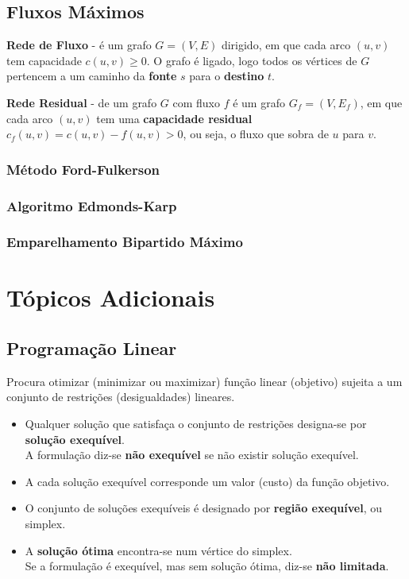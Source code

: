 \documentclass[11pt]{article}
\begin{document}
\subsection{Fluxos Máximos} 

\textbf{Rede de Fluxo} - é um grafo $G=(V,E)$ dirigido, em que cada arco $(u,v)$ tem capacidade $c(u,v) \ge 0$. O grafo é ligado, logo todos os vértices de $G$ pertencem a um caminho da \textbf{fonte} $s$ para o \textbf{destino} $t$.

\textbf{Rede Residual} - de um grafo $G$ com fluxo $f$ é um grafo $G_f=(V,E_f)$, em que cada arco $(u,v)$ tem uma \textbf{capacidade residual} $c_f(u,v)=c(u,v)-f(u,v)>0$, ou seja, o fluxo que sobra de $u$ para $v$.

\subsubsection{Método Ford-Fulkerson}



\subsubsection{Algoritmo Edmonds-Karp}



\subsubsection{Emparelhamento Bipartido Máximo}



\newpage

\section{Tópicos Adicionais}

\subsection{Programação Linear} 

Procura otimizar (minimizar ou maximizar) função linear (objetivo) sujeita a um conjunto de restrições (desigualdades) lineares.

\begin{itemize}[topsep=0pt]
    \item Qualquer solução que satisfaça o conjunto de restrições designa-se por \textbf{solução exequível}. \\[4pt]
          A formulação diz-se \textbf{não exequível} se não existir solução exequível.
    \item A cada solução exequível corresponde um valor (custo) da função objetivo.
    \item O conjunto de soluções exequíveis é designado por \textbf{região exequível}, ou simplex.
    \item A \textbf{solução ótima} encontra-se num vértice do simplex. \\[4pt]
          Se a formulação é exequível, mas sem solução ótima, diz-se \textbf{não limitada}.
\end{itemize}
\end{document}
